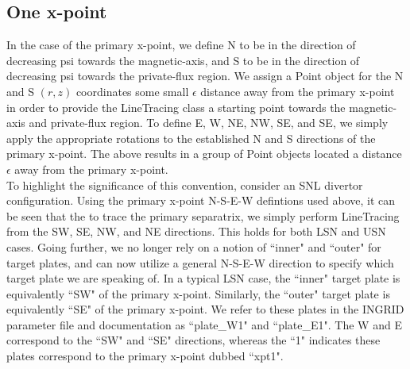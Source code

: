 \subsection{\label{sec:level2}One x-point}
In the case of the primary x-point, we define N to be in the direction of decreasing psi towards the magnetic-axis, and S to be in the direction of decreasing psi towards the private-flux region. We assign a Point object for the N and S $(r,z)$ coordinates some small $\epsilon$ distance away from the primary x-point in order to provide the LineTracing class a starting point towards the magnetic-axis and private-flux region. To define E, W, NE, NW, SE, and SE, we simply apply the appropriate rotations to the established N and S directions of the primary x-point. The above results in a group of Point objects located a distance $\epsilon$ away from the primary x-point.\\ \indent
To highlight the significance of this convention, consider an SNL divertor configuration. Using the primary x-point N-S-E-W defintions used above, it can be seen that the to trace the primary separatrix, we simply perform LineTracing from the SW, SE, NW, and NE directions. This holds for both LSN and USN cases. Going further, we no longer rely on a notion of ``inner" and ``outer" for target plates, and can now utilize a general N-S-E-W direction to specify which target plate we are speaking of. In a typical LSN case, the ``inner" target plate is equivalently ``SW" of the primary x-point. Similarly, the ``outer" target plate is equivalently ``SE" of the primary x-point. We refer to these plates in the INGRID parameter file and documentation as ``plate\_W1" and ``plate\_E1". The W and E correspond to the ``SW" and ``SE" directions, whereas the ``1" indicates these plates correspond to the primary x-point dubbed ``xpt1".
